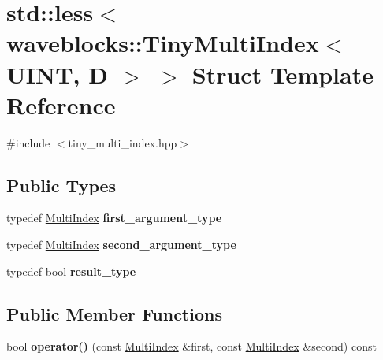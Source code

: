 \hypertarget{structstd_1_1less_3_01waveblocks_1_1_tiny_multi_index_3_01_u_i_n_t_00_01_d_01_4_01_4}{}\section{std\+:\+:less$<$ waveblocks\+:\+:Tiny\+Multi\+Index$<$ U\+I\+N\+T, D $>$ $>$ Struct Template Reference}
\label{structstd_1_1less_3_01waveblocks_1_1_tiny_multi_index_3_01_u_i_n_t_00_01_d_01_4_01_4}


{\ttfamily \#include $<$tiny\+\_\+multi\+\_\+index.\+hpp$>$}

\subsection*{Public Types}
\begin{DoxyCompactItemize}
\item 
\hypertarget{structstd_1_1less_3_01waveblocks_1_1_tiny_multi_index_3_01_u_i_n_t_00_01_d_01_4_01_4_aae355d29ecb3529615ea781af3e67997}{}typedef \hyperlink{classwaveblocks_1_1_tiny_multi_index}{Multi\+Index} {\bfseries first\+\_\+argument\+\_\+type}\label{structstd_1_1less_3_01waveblocks_1_1_tiny_multi_index_3_01_u_i_n_t_00_01_d_01_4_01_4_aae355d29ecb3529615ea781af3e67997}

\item 
\hypertarget{structstd_1_1less_3_01waveblocks_1_1_tiny_multi_index_3_01_u_i_n_t_00_01_d_01_4_01_4_a14f40a92cec3d63ff435e533953f7a20}{}typedef \hyperlink{classwaveblocks_1_1_tiny_multi_index}{Multi\+Index} {\bfseries second\+\_\+argument\+\_\+type}\label{structstd_1_1less_3_01waveblocks_1_1_tiny_multi_index_3_01_u_i_n_t_00_01_d_01_4_01_4_a14f40a92cec3d63ff435e533953f7a20}

\item 
\hypertarget{structstd_1_1less_3_01waveblocks_1_1_tiny_multi_index_3_01_u_i_n_t_00_01_d_01_4_01_4_ae6adf13e35fd3b3a498f7ecc7fd900d4}{}typedef bool {\bfseries result\+\_\+type}\label{structstd_1_1less_3_01waveblocks_1_1_tiny_multi_index_3_01_u_i_n_t_00_01_d_01_4_01_4_ae6adf13e35fd3b3a498f7ecc7fd900d4}

\end{DoxyCompactItemize}
\subsection*{Public Member Functions}
\begin{DoxyCompactItemize}
\item 
\hypertarget{structstd_1_1less_3_01waveblocks_1_1_tiny_multi_index_3_01_u_i_n_t_00_01_d_01_4_01_4_a1cd256d8f01a89874863e6aebc8133d0}{}bool {\bfseries operator()} (const \hyperlink{classwaveblocks_1_1_tiny_multi_index}{Multi\+Index} \&first, const \hyperlink{classwaveblocks_1_1_tiny_multi_index}{Multi\+Index} \&second) const \label{structstd_1_1less_3_01waveblocks_1_1_tiny_multi_index_3_01_u_i_n_t_00_01_d_01_4_01_4_a1cd256d8f01a89874863e6aebc8133d0}

\end{DoxyCompactItemize}


